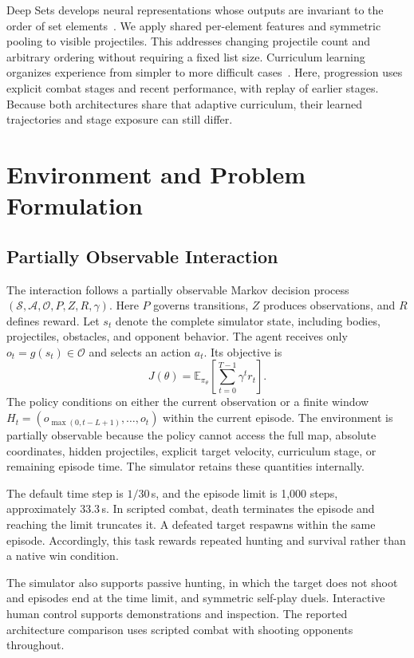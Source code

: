 \documentclass[conference]{IEEEtran}
\newcommand{\E}{\mathbb{E}}
\begin{document}
Deep Sets develops neural representations whose outputs are invariant to the order of set elements~\cite{deepsets}. We apply shared per-element features and symmetric pooling to visible projectiles. This addresses changing projectile count and arbitrary ordering without requiring a fixed list size. Curriculum learning organizes experience from simpler to more difficult cases~\cite{curriculum}. Here, progression uses explicit combat stages and recent performance, with replay of earlier stages. Because both architectures share that adaptive curriculum, their learned trajectories and stage exposure can still differ.

\section{Environment and Problem Formulation}
\subsection{Partially Observable Interaction}
The interaction follows a partially observable Markov decision process $(\mathcal{S},\mathcal{A},\mathcal{O},P,Z,R,\gamma)$. Here $P$ governs transitions, $Z$ produces observations, and $R$ defines reward. Let $s_t$ denote the complete simulator state, including bodies, projectiles, obstacles, and opponent behavior. The agent receives only $o_t=g(s_t)\in\mathcal{O}$ and selects an action $a_t$. Its objective is
\begin{equation}
J(\theta)=\E_{\pi_\theta}\!\left[\sum_{t=0}^{T-1}\gamma^t r_t\right].
\end{equation}
The policy conditions on either the current observation or a finite window $H_t=(o_{\max(0,t-L+1)},\ldots,o_t)$ within the current episode. The environment is partially observable because the policy cannot access the full map, absolute coordinates, hidden projectiles, explicit target velocity, curriculum stage, or remaining episode time. The simulator retains these quantities internally.

The default time step is $1/30$\,s, and the episode limit is 1,000 steps, approximately 33.3\,s. In scripted combat, death terminates the episode and reaching the limit truncates it. A defeated target respawns within the same episode. Accordingly, this task rewards repeated hunting and survival rather than a native win condition.

The simulator also supports passive hunting, in which the target does not shoot and episodes end at the time limit, and symmetric self-play duels. Interactive human control supports demonstrations and inspection. The reported architecture comparison uses scripted combat with shooting opponents throughout.
\end{document}
